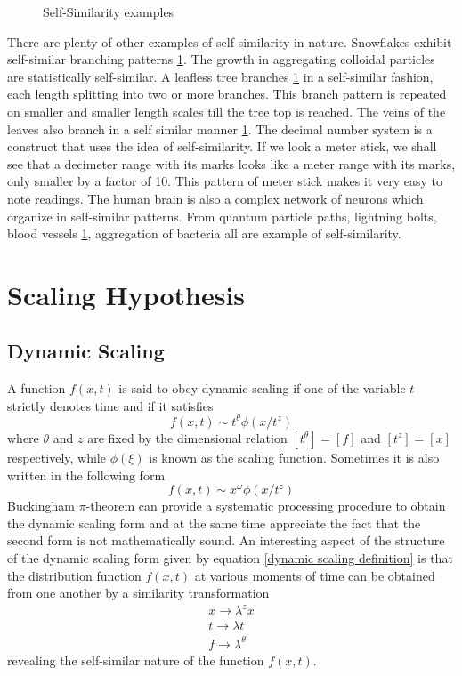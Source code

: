 \begin{figure}
	\caption{Self-Similarity examples}
	\label{fig:example-self-similarity}
\end{figure}


There are plenty of other examples of self similarity in nature. Snowflakes exhibit self-similar branching patterns \ref{fig:example-self-similarity}. The growth in aggregating colloidal particles are statistically self-similar. A leafless tree branches \ref{fig:example-self-similarity} in a self-similar fashion, each length splitting into two or more branches. This branch pattern is repeated on smaller and smaller length scales till the tree top is reached. The veins of the leaves also branch in a self similar manner \ref{fig:example-self-similarity}. The decimal number system is a construct that uses the idea of self-similarity. If we look a meter stick, we shall see that a decimeter range with its marks looks like a meter range with its marks, only smaller by a factor of 10. This pattern of meter stick makes it very easy to note readings. The human brain is also a complex network of neurons which organize in self-similar patterns. From quantum particle paths, lightning bolts, blood vessels \ref{fig:example-self-similarity}, aggregation of bacteria all are example of self-similarity.
\section{Scaling Hypothesis}
	\subsection{Dynamic Scaling}
	A function $f(x,t)$ is said to obey dynamic scaling if one of the variable $t$ strictly denotes time and if it satisfies
	\begin{equation}
		f(x,t) \sim t^\theta \phi(x/t^z)
		\label{dynamic scaling definition}
	\end{equation}
	where $\theta$ and $z$ are fixed by the dimensional relation $\left[t^\theta\right] = \left[f\right]$ and $\left[t^z\right] = \left[x\right]$ respectively, while $\phi(\xi)$ is known as the scaling function. Sometimes it is also written in the following form
		\begin{equation}
	f(x,t) \sim x^\omega \phi(x/t^z)
	\label{dynamic scaling definition 2}
	\end{equation}
	Buckingham $\pi$-theorem can provide a systematic processing procedure to obtain the dynamic scaling form and at the same time appreciate the fact that the second form is not mathematically sound. An interesting aspect of the structure of the dynamic scaling form given by equation \ref{dynamic scaling definition} is that the distribution function $f(x,t)$ at various moments of time can be obtained from one another by a similarity transformation
	\begin{align}
		x \rightarrow \lambda^z x \\
		t \rightarrow \lambda t \\
		f \rightarrow \lambda^\theta
	\end{align}
	revealing the self-similar nature of the function $f(x,t)$.\\
	
